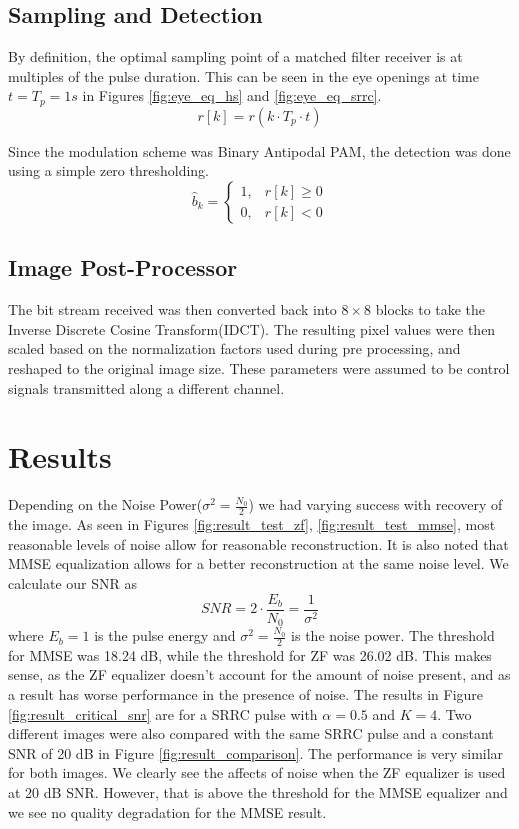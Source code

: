 \subsection{Sampling and Detection}
By definition, the optimal sampling point of a matched filter receiver is at multiples of the pulse duration. This can be seen in the eye openings at time $t=T_p=1 \unit{ s}$ in Figures \ref{fig:eye_eq_hs} and \ref{fig:eye_eq_srrc}.  
\begin{equation}
	r[k] = r(k \cdot T_p \cdot t)
	\label{equation:sampling}
\end{equation}


Since the modulation scheme was Binary Antipodal PAM, the detection was done using a simple zero thresholding.
\begin{equation}
	\hat{b}_{k} = 	\begin{cases}
						1, & r[k] \geq 0 \\
						0, & r[k] < 0 
					\end{cases}
	\label{equation:detection}
\end{equation}

\subsection{Image Post-Processor}
The bit stream received was then converted back into $8 \times 8$ blocks to take the Inverse Discrete Cosine Transform(IDCT). The resulting pixel values were then scaled based on the normalization factors used during pre processing, and reshaped to the original image size. These parameters were assumed to be control signals transmitted along a different channel.

\section{Results}
Depending on the Noise Power($\sigma^2 = \frac{N_0}{2}$) we had varying success with recovery of the image. As seen in Figures \ref{fig:result_test_zf}, \ref{fig:result_test_mmse}, most reasonable levels of noise allow for reasonable reconstruction. It is also noted that MMSE equalization allows for a better reconstruction at the same noise level. We calculate our SNR as
\[ SNR = 2 \cdot \frac{E_b}{N_0} = \frac{1}{\sigma^2}\]
where $E_b = 1$ is the pulse energy and $\sigma^2 = \frac{N_0}{2}$ is the noise power. The threshold for MMSE was 18.24 dB, while the threshold for ZF was 26.02 dB. This makes sense, as the ZF equalizer doesn’t account for the amount of noise present, and as a result has worse performance in the presence of noise. The results in Figure \ref{fig:result_critical_snr} are for a SRRC pulse with $\alpha = 0.5$ and $K = 4$. Two different images were also compared with the same SRRC pulse and a constant SNR of 20 dB in Figure \ref{fig:result_comparison}. The performance is very similar for both images. We clearly see the affects of noise when the ZF equalizer is used at 20 dB SNR. However, that is above the threshold for the MMSE equalizer and we see no quality degradation for the MMSE result.  

